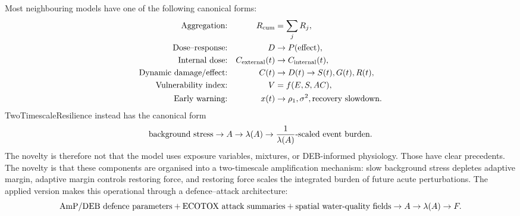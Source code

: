 	Most neighbouring models have one of the following canonical forms:
	\begin{align}
		\hbox{Aggregation:} && R_{\mathrm{cum}} &= \sum_j R_j,\\
		\hbox{Dose--response:} && D &\rightarrow P(\hbox{effect}),\\
		\hbox{Internal dose:} && C_{\mathrm{external}}(t)&\rightarrow C_{\mathrm{internal}}(t),\\
		\hbox{Dynamic damage/effect:} && C(t)&\rightarrow D(t)\rightarrow S(t),G(t),R(t),\\
		\hbox{Vulnerability index:} && V&=f(E,S,AC),\\
		\hbox{Early warning:} && x(t)&\rightarrow \rho_1,\sigma^2,\hbox{recovery slowdown}.
	\end{align}
	TwoTimescaleResilience instead has the canonical form
	\begin{equation}
		\hbox{background stress}\rightarrow A\rightarrow\lambda(A)\rightarrow \frac{1}{\lambda(A)}\hbox{-scaled event burden}.
	\end{equation}
	The novelty is therefore not that the model uses exposure variables, mixtures, or DEB-informed physiology. Those have clear precedents. The novelty is that these components are organised into a two-timescale amplification mechanism: slow background stress depletes adaptive margin, adaptive margin controls restoring force, and restoring force scales the integrated burden of future acute perturbations. The applied version makes this operational through a defence--attack architecture:
	\begin{equation}
		\hbox{AmP/DEB defence parameters} + \hbox{ECOTOX attack summaries} + \hbox{spatial water-quality fields}
		\rightarrow A\rightarrow\lambda(A)\rightarrow F.
	\end{equation}
	
	
	
